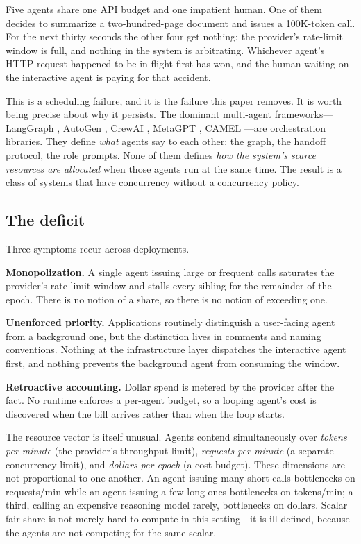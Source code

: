 \documentclass[letterpaper,11pt,leqno]{article}
\begin{document}
Five agents share one API budget and one impatient human. One of them decides to summarize a two-hundred-page document and issues a 100K-token call. For the next thirty seconds the other four get nothing: the provider's rate-limit window is full, and nothing in the system is arbitrating. Whichever agent's HTTP request happened to be in flight first has won, and the human waiting on the interactive agent is paying for that accident.

This is a scheduling failure, and it is the failure this paper removes. It is worth being precise about why it persists. The dominant multi-agent frameworks---LangGraph \citep{LangChain24}, AutoGen \citep{Wu23}, CrewAI \citep{CrewAI24}, MetaGPT \citep{Hong24}, CAMEL \citep{Li23}---are orchestration libraries. They define \emph{what} agents say to each other: the graph, the handoff protocol, the role prompts. None of them defines \emph{how the system's scarce resources are allocated} when those agents run at the same time. The result is a class of systems that have concurrency without a concurrency policy.

\subsection{The deficit}\label{s:deficit}

Three symptoms recur across deployments.

\textbf{Monopolization.} A single agent issuing large or frequent calls saturates the provider's rate-limit window and stalls every sibling for the remainder of the epoch. There is no notion of a share, so there is no notion of exceeding one.

\textbf{Unenforced priority.} Applications routinely distinguish a user-facing agent from a background one, but the distinction lives in comments and naming conventions. Nothing at the infrastructure layer dispatches the interactive agent first, and nothing prevents the background agent from consuming the window.

\textbf{Retroactive accounting.} Dollar spend is metered by the provider after the fact. No runtime enforces a per-agent budget, so a looping agent's cost is discovered when the bill arrives rather than when the loop starts.

The resource vector is itself unusual. Agents contend simultaneously over \emph{tokens per minute} (the provider's throughput limit), \emph{requests per minute} (a separate concurrency limit), and \emph{dollars per epoch} (a cost budget). These dimensions are not proportional to one another. An agent issuing many short calls bottlenecks on requests/min while an agent issuing a few long ones bottlenecks on tokens/min; a third, calling an expensive reasoning model rarely, bottlenecks on dollars. Scalar fair share is not merely hard to compute in this setting---it is ill-defined, because the agents are not competing for the same scalar.
\end{document}
